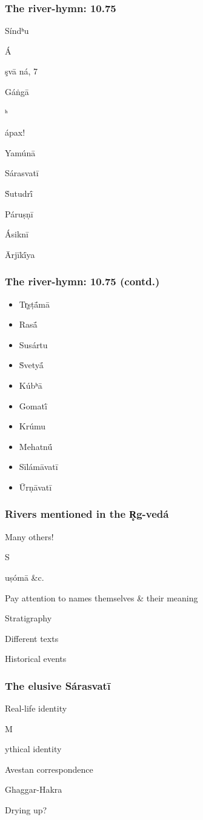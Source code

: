 \documentclass[pdf]{beamer}
\newcommand{\Subitem}[1]{{\setlength\itemindent{12pt} \item[-] #1}}
\begin{document}
\begin{frame} \frametitle{The river-hymn: 10.75}
\begin{itemize}
	\item Síndʰu
	\Subitem Áşvā ná, 7
	\item Gáṅgā
	\Subitem ʰápax!
	\item Yamúnā
	\item Sárasvatī
	\item Ṡutudrī́
	\item Páruṣṇī
	\item Ásiknī
	\item Ārjīkī́ya
\end{itemize}
\end{frame}

\begin{frame} \frametitle{The river-hymn: 10.75 (contd.)}
\begin{itemize}
	\item Tr̥ṣṭā́mā
	\item Rasā́
	\item Susártu
	\item Ṡvetyā́
	\item Kúbʰā
	\item Gomatī́
	\item Krúmu
	\item Mehatnū́
	\item Sīlámāvatī
	\item Ū́rṇāvatī
\end{itemize}
\end{frame}

\begin{frame} \frametitle{Rivers mentioned in the R̥g-vedá}
\begin{itemize}
	\item Many others!
	\Subitem Suṣómā \&c.
	\item Pay attention to names themselves \& their meaning
	\item Stratigraphy
	\item Different texts
	\item Historical events
\end{itemize}
\end{frame}

\begin{frame} \frametitle{The elusive Sárasvatī}
\begin{itemize}
	\item Real-life identity
	\Subitem Mythical identity
	\item Avestan correspondence
	\item Ghaggar-Hakra
	\item Drying up?
\end{itemize}
\end{frame}

\end{document}
